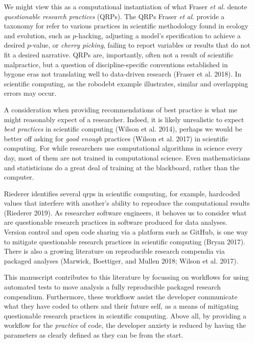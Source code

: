 \documentclass[
]{article}
\begin{document}
We might view this as a computational instantiation of what Fraser
\emph{et al.} denote \emph{questionable research practices} (QRPs). The
QRPs Fraser \emph{et al.} provide a taxonomy for refer to various
practices in scientific methodology found in ecology and evolution, such
as \(p\)-hacking, adjusting a model's specification to achieve a desired
\(p\)-value, or \emph{cherry picking}, failing to report variables or
results that do not fit a desired narrative. QRPs are, importantly,
often not a result of scientific malpractice, but a question of
discipline-specific conventions established in bygone eras not
translating well to data-driven research (Fraser et al. 2018). In
scientific computing, as the robodebt example illustrates, similar and
overlapping errors may occur.

A consideration when providing recommendations of best practice is what
me might reasonably expect of a researcher. Indeed, it is likely
unrealistic to expect \emph{best practices} in scientific computing
(Wilson et al. 2014), perhaps we would be better off asking for
\emph{good enough} practices (Wilson et al. 2017) in scientific
computing. For while researchers use computational algorithms in science
every day, most of them are not trained in computational science. Even
mathematicians and statisticians do a great deal of training at the
blackboard, rather than the computer.

Riederer identifies several qrps in scientific computing, for example,
hardcoded values that interfere with another's ability to reproduce the
computational results (Riederer 2019). As researcher software engineers,
it behoves us to consider what are questionable research practices in
software produced for data analyses. Version control and open code
sharing via a platform such as GitHub, is one way to mitigate
questionable research practices in scientific computing (Bryan 2017).
There is also a growing literature on reproducible research compendia
via packaged analyses (Marwick, Boettiger, and Mullen 2018; Wilson et
al. 2017).

This manuscript contributes to this literature by focussing on workflows
for using automated tests to move analysis a fully reproducible packaged
research compendium. Furthermore, these workflosw assist the developer
communicate what they have coded to others and their future self, as a
means of mitigating questionable research practices in scientific
computing. Above all, by providing a workflow for the \emph{practice} of
code, the developer anxiety is reduced by having the parameters as
clearly defined as they can be from the start.
\end{document}
